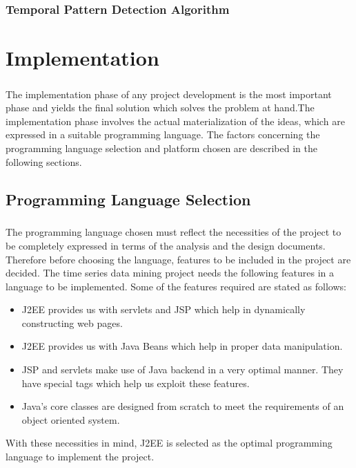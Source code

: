 \documentclass[12pt,a4paper]{report}
\begin{document}
\subsection{Temporal Pattern Detection Algorithm}


\chapter{Implementation}
\pagestyle{fancy}
\chead{}
\rfoot{\small{\thepage}}
\renewcommand{\headrulewidth}{0.4pt}
\renewcommand{\footrulewidth}{0.4pt}
\paragraph{}The implementation phase of any project development is the most important phase and yields the final solution which solves the problem at hand.The implementation phase involves the actual materialization of the ideas, which are expressed in a suitable programming language. The factors concerning the programming language selection and platform chosen are described in the following sections.
\section{Programming Language Selection}

\paragraph{}The programming language chosen must reflect the necessities of the project to be completely expressed in terms of the analysis and the design documents. Therefore before choosing the language, features to be included in the project are decided. The time series data mining project needs the following features in a language to be implemented. Some of the features required are stated as follows:
\begin{itemize}
\item J2EE provides us with servlets and JSP which help in dynamically constructing web pages.
\item J2EE provides us with Java Beans which help in proper data manipulation.
\item JSP and servlets make use of Java backend in a very optimal manner. They have special tags which help us exploit these features.
\item Java's core classes are designed from scratch to meet the requirements of an object oriented system.
\end{itemize} 
With these necessities in mind, J2EE is selected as the optimal programming language to implement the project.
\end{document}
